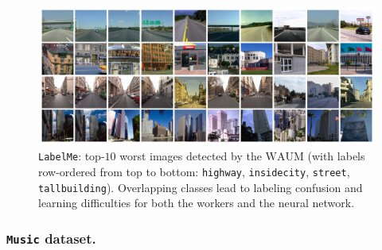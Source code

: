 \begin{figure}[t]
    \centering
    \includegraphics[width=0.9\columnwidth]{images/lowest_labelme_highway_insidecity_street_tallbuilding.pdf}
    \caption{\texttt{LabelMe}: top-$10$ worst images  detected by the $\mathrm{WAUM}$ (with labels row-ordered from top to bottom: \texttt{highway}, \texttt{insidecity}, \texttt{street}, \texttt{tallbuilding}). Overlapping classes lead to labeling confusion and learning difficulties for both the workers and the neural network.}
    \label{fig:worse_labelme}
\end{figure}

\subsubsection*{\texttt{Music} dataset.}

